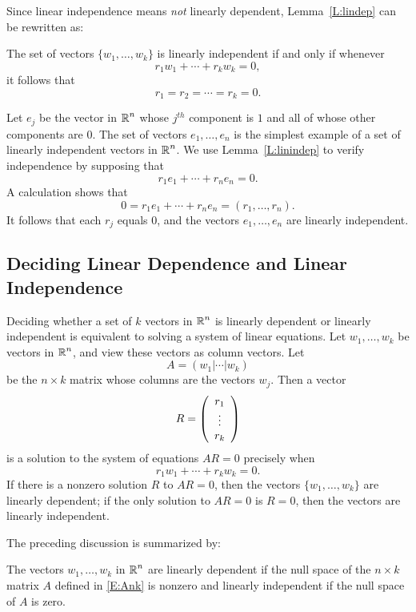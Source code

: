 \documentclass{ximera}
\begin{document}
Since linear independence means {\em not\/} linearly dependent,
Lemma~\ref{L:lindep} can be rewritten as:
\begin{lemma}  \label{L:linindep}
The set of vectors $\{w_1,\ldots,w_k\}$ is linearly independent if and
only if whenever
\[
r_1w_1 + \cdots + r_kw_k = 0,
\]
it follows that
\[
r_1 = r_2 = \cdots = r_k = 0.
\]
\end{lemma}

Let $e_j$ be the vector in $\mbox{$\Bbb{R}$}^n$ whose $j^{th}$ component is $1$
and all of whose other components are $0$. The set of vectors
$e_1,\ldots,e_n$ is the simplest example of a set of linearly
independent vectors in $\mbox{$\Bbb{R}$}^n$.  We use Lemma~\ref{L:linindep} to
verify independence by supposing that
\[
r_1e_1 + \cdots + r_ne_n = 0.
\]
A calculation shows that
\[
0 = r_1e_1 + \cdots + r_ne_n = (r_1,\ldots,r_n).
\]
It follows that each $r_j$ equals $0$, and the vectors
$e_1,\ldots,e_n$ are linearly independent.


\subsection*{Deciding Linear Dependence and Linear Independence}

Deciding whether a set of $k$ vectors in $\mbox{$\Bbb{R}$}^n$ is linearly
dependent or linearly independent is equivalent to solving a
system of linear equations.  Let $w_1,\ldots,w_k$ be vectors
in $\mbox{$\Bbb{R}$}^n$, and view these vectors as column vectors. Let
\begin{equation}  \label{E:Ank}
A=(w_1|\cdots|w_k)
\end{equation}
be the $n\times k$ matrix whose columns are the vectors $w_j$.
Then a vector
\[
R = \left(\begin{array}{c} r_1 \\ \vdots \\ r_{k}\end{array}\right)
\]
is a solution to the system of equations $AR=0$ precisely when
\begin{equation}
r_1w_1 + \cdots + r_kw_k = 0.
\end{equation}
If there is a nonzero solution $R$ to $AR=0$, then the vectors
$\{w_1,\ldots,w_k\}$ are linearly dependent; if the only solution
to $AR=0$ is $R=0$, then the vectors are linearly independent.

The preceding discussion is summarized by:
\begin{lemma}
The vectors $w_1,\ldots,w_k$ in $\mbox{$\Bbb{R}$}^n$ are linearly dependent if the
null space of the $n\times k$ matrix $A$ defined in \eqref{E:Ank} is
nonzero and linearly independent if the null space of $A$ is zero.
\end{lemma} 
\end{document}
